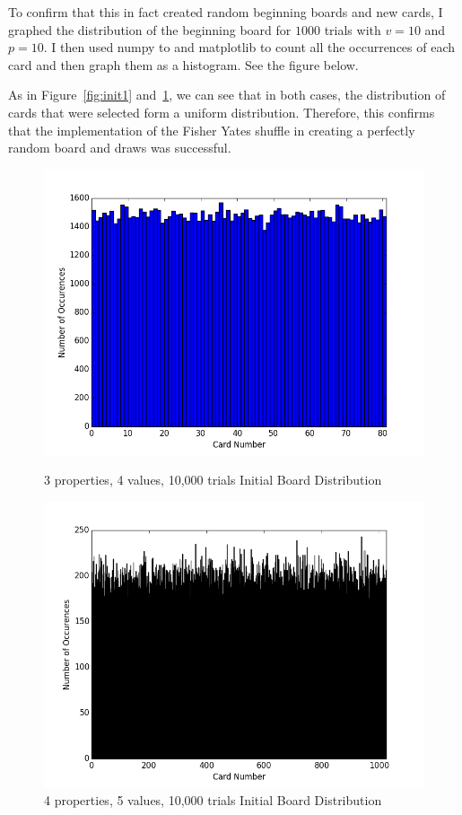 \documentclass[pageno]{jpaper}
\begin{document}
To confirm that this in fact created random beginning boards and new cards, I graphed the distribution of the beginning board for $1000$ trials with $v = 10$ and $p = 10$. I then used numpy to and matplotlib to count all the occurrences of each card and then graph them as a histogram. See the figure below.

As in Figure~\ref{fig:init1}  and~\ref{fig:init2}, we can see that in both cases, the distribution of cards that were selected form a uniform distribution. Therefore, this confirms that the implementation of the Fisher Yates shuffle in creating a perfectly random board and draws was successful. 

\begin{figure}[htbb]
\begin{minipage}[b]{0.5\linewidth}
\centering
\includegraphics[width=.75\linewidth]{3p4v10000Init.png}
\caption{3 properties, 4 values, 10,000 trials Initial Board Distribution}
\label{fig:init1}
\end{minipage}
\hspace{0.5cm}
\begin{minipage}[b]{0.5\linewidth}
\centering
\includegraphics[width=.75\linewidth]{4p5v10000Init.png}
\caption{4 properties, 5 values, 10,000 trials Initial Board Distribution}
\label{fig:init2}
\end{minipage}
\end{figure}
\end{document}

